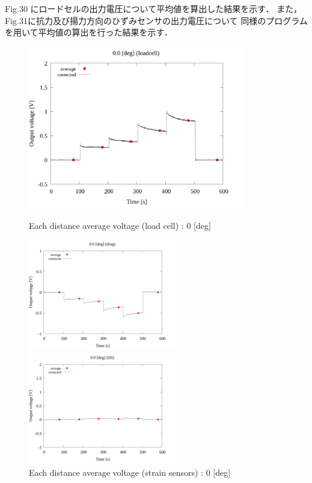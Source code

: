 Fig.30 にロードセルの出力電圧について平均値を算出した結果を示す．
また，Fig.31に抗力及び揚力方向のひずみセンサの出力電圧について
同様のプログラムを用いて平均値の算出を行った結果を示す．

\begin{figure}[htbp]
  \footnotesize
  \begin{center}
    \includegraphics[width=95mm]{../../02_workspace/result/2-1/plot/03-1_loadcell/03_loadcell_average_0.png}
    \caption{Each distance average voltage (load cell) : 0 [deg]}
  \end{center}
  \begin{minipage}[b]{0.45\linewidth}
    \centering
    \includegraphics[width=65mm]{../../02_workspace/result/2-1/plot/03-2_drag/03_drag_average_0.png}
  \end{minipage}
  \begin{minipage}[b]{0.45\linewidth}
    \centering
    \includegraphics[width=65mm]{../../02_workspace/result/2-1/plot/03-3_lift/03_lift_average_0.png}
  \end{minipage}
  \caption{Each distance average voltage (strain sensors) : 0 [deg]}
\end{figure}

